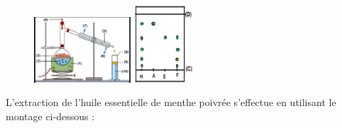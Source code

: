 \documentclass[12pt]{article}
\begin{document}
\begin{figure}
	\vspace{-0.6cm}
	\begin{center}
    \includegraphics[width=0.32\textwidth]{./img/hydro.png}
	\includegraphics[width=0.2\textwidth]{./img/CCM.png}
\end{center}
\end{figure}
L’extraction de l’huile essentielle de menthe poivrée s’effectue en utilisant le montage ci-dessous :
\end{document}
